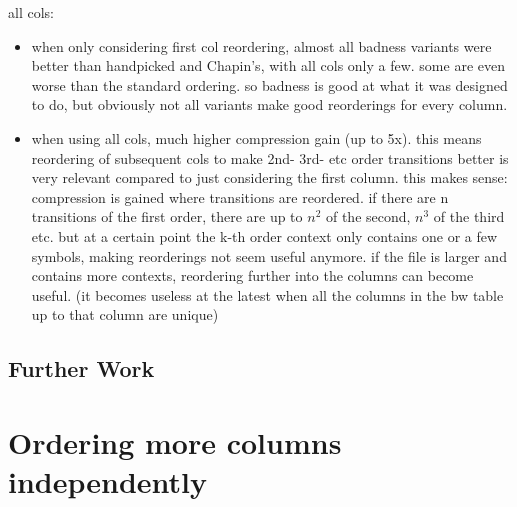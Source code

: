\documentclass[a4paper]{scrreprt}
\begin{document}
all cols:
\begin{itemize}
  \item when only considering first col reordering, almost all badness variants
  were better than handpicked and Chapin's, with all cols only a few. some are
  even worse than the standard ordering. so badness is good at what it was
  designed to do, but obviously not all variants make good reorderings for every
  column.
  \item when using all cols, much higher compression gain (up to 5x). this means
  reordering of subsequent cols to make 2nd- 3rd- etc order transitions better
  is very relevant compared to just considering the first column. this makes
  sense: compression is gained where transitions are reordered. if there are n
  transitions of the first order, there are up to \(n^2\) of the second, \(n^3\)
  of the third etc. but at a certain point the k-th order context only contains
  one or a few symbols, making reorderings not seem useful anymore. if the file
  is larger and contains more contexts, reordering further into the columns can
  become useful. (it becomes useless at the latest when all the columns in the
  bw table up to that column are unique)
\end{itemize}


\section{Further Work}


\chapter{Ordering more columns independently}


\end{document}
